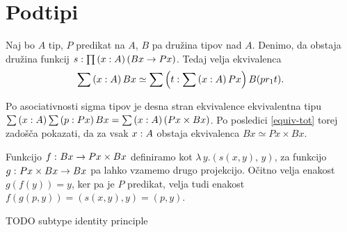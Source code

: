 \section{Podtipi}

\begin{trditev}
  \label{full-subtype}
  Naj bo \(A\) tip, \(P\) predikat na \(A\), \(B\) pa družina tipov nad \(A\). Denimo, da
  obstaja družina funkcij \(s : \prod \left( x : A \right) (Bx \to Px)\).
  Tedaj velja ekvivalenca
  \[\sum \left( x : A \right) Bx \simeq \sum \left( t : \sum \left( x : A \right) Px \right) B (pr_{1} t).\]
\end{trditev}

\begin{dokaz}
  Po asociativnosti sigma tipov je desna stran ekvivalence ekvivalentna tipu
  \(\sum \left( x : A \right) \sum \left( p : Px \right) Bx = \sum \left( x : A \right) (Px \times Bx)\).
  Po posledici \ref{equiv-tot} torej zadošča pokazati, da za vsak \(x : A\)
  obstaja ekvivalenca \(Bx \simeq Px \times Bx\).

  Funkcijo \(f \,\colon Bx \to Px \times Bx\) definiramo kot
  \(\lambda \, y. \left(s(x,y),\, y\right)\), za funkcijo \(g \,\colon Px \times Bx \to Bx\) pa
  lahko vzamemo drugo projekcijo. Očitno velja enakost \(g(f(y)) = y\), ker pa je \(P\)
  predikat, velja tudi enakost
  \(f(g\left(p, y\right)) = \left(s(x, y), y\right) = \left(p, y\right)\).

\end{dokaz}

\begin{trditev}
  \label{subtype-id}
  TODO subtype identity principle
\end{trditev}

